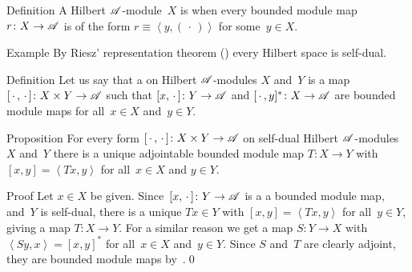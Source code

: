 \documentclass[a]{subfiles}
\begin{document}
\begin{parsec}%
\begin{point}{Definition}%
A Hilbert $\mathscr{A}$-module~$X$ is 
when every bounded module map $r\colon X\to \mathscr{A}$
is of the form $r\equiv \left<y,(\,\cdot\,)\right>$
for some~$y\in X$.
\end{point}
\begin{point}{Example}%
By Riesz' representation theorem ()
every Hilbert space is self-dual.
\end{point}
\begin{point}{Definition}%
Let us say that a 
on Hilbert $\mathscr{A}$-modules
$X$ and~$Y$
is a map $[\,\cdot\,,\,\cdot\,]\colon X\times Y\to \mathscr{A}$
such that $[x,\,\cdot\,]\colon Y\to \mathscr{A}$
and $[\,\cdot\,,y]^*\colon X\to \mathscr{A}$
are bounded module maps for all~$x\in X$ and~$y\in Y$.
\end{point}
\begin{point}{Proposition}%
For every form  $[\,\cdot\,,\,\cdot\,]\colon X\times Y\rightarrow \mathscr{A}$
on self-dual Hilbert $\mathscr{A}$-modules
$X$ and~$Y$
there is a unique adjointable bounded module map 
$T\colon X\to Y$
with
$[x,y] =\left<Tx,y\right>$
for all~$x\in X$ and $y\in Y$.
\begin{point}{Proof}%
Let $x\in X$ be given.
Since~$[x,\,\cdot\,]\colon Y\to \mathscr{A}$ is a
a bounded module map,
and~$Y$ is self-dual,
there is a unique $Tx\in Y$ with
$[x,y]=\left<Tx,y\right>$
for all~$y\in Y$,
giving a map $T\colon X\to Y$.
For a similar reason
we get a map $S\colon Y\to X$
with $\left<Sy,x\right>=[x,y]^*$ 
for all~$x\in X$ and~$y\in Y$.
Since $S$ and~$T$ are clearly adjoint,
they are bounded module maps by~.\qed
\end{point}
\end{point}
\end{parsec}
\end{document}
